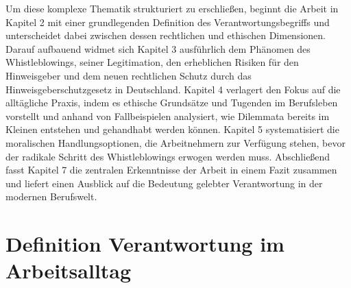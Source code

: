 \documentclass[
    12pt,               %
    a4paper,            %
    ngerman             %
]{scrartcl}
\begin{document}
%

Um diese komplexe Thematik strukturiert zu erschließen, beginnt die Arbeit in Kapitel 2 mit einer grundlegenden Definition des Verantwortungsbegriffs und unterscheidet dabei zwischen dessen rechtlichen und ethischen Dimensionen. Darauf aufbauend widmet sich Kapitel 3 ausführlich dem Phänomen des Whistleblowings, seiner Legitimation, den erheblichen Risiken für den Hinweisgeber und dem neuen rechtlichen Schutz durch das Hinweisgeberschutzgesetz in Deutschland. Kapitel 4 verlagert den Fokus auf die alltägliche Praxis, indem es ethische Grundsätze und Tugenden im Berufsleben vorstellt und anhand von Fallbeispielen analysiert, wie Dilemmata bereits im Kleinen entstehen und gehandhabt werden können. Kapitel 5 systematisiert die moralischen Handlungsoptionen, die Arbeitnehmern zur Verfügung stehen, bevor der radikale Schritt des Whistleblowings erwogen werden muss. Abschließend fasst Kapitel 7 die zentralen Erkenntnisse der Arbeit in einem Fazit zusammen und liefert einen Ausblick auf die Bedeutung gelebter Verantwortung in der modernen Berufswelt.


\section{Definition Verantwortung im Arbeitsalltag}
\par\noindent %
\end{document}
